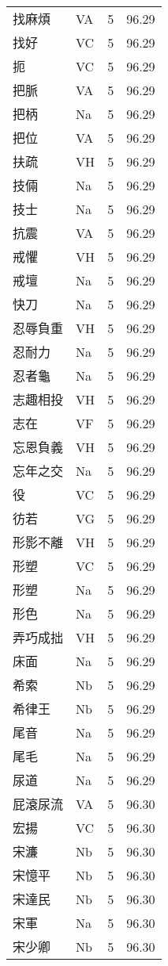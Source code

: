\documentclass[twocolumn]{book}
\begin{document}
\begin{supertabular}{llrr}
找麻煩 & VA & 5 &  96.29\\
找好 & VC & 5 &  96.29\\
扼 & VC & 5 &  96.29\\
把脈 & VA & 5 &  96.29\\
把柄 & Na & 5 &  96.29\\
把位 & VA & 5 &  96.29\\
扶疏 & VH & 5 &  96.29\\
技倆 & Na & 5 &  96.29\\
技士 & Na & 5 &  96.29\\
抗震 & VA & 5 &  96.29\\
戒懼 & VH & 5 &  96.29\\
戒壇 & Na & 5 &  96.29\\
快刀 & Na & 5 &  96.29\\
忍辱負重 & VH & 5 &  96.29\\
忍耐力 & Na & 5 &  96.29\\
忍者龜 & Na & 5 &  96.29\\
志趣相投 & VH & 5 &  96.29\\
志在 & VF & 5 &  96.29\\
忘恩負義 & VH & 5 &  96.29\\
忘年之交 & Na & 5 &  96.29\\
役 & VC & 5 &  96.29\\
彷若 & VG & 5 &  96.29\\
形影不離 & VH & 5 &  96.29\\
形塑 & VC & 5 &  96.29\\
形塑 & Na & 5 &  96.29\\
形色 & Na & 5 &  96.29\\
弄巧成拙 & VH & 5 &  96.29\\
床面 & Na & 5 &  96.29\\
希索 & Nb & 5 &  96.29\\
希律王 & Nb & 5 &  96.29\\
尾音 & Na & 5 &  96.29\\
尾毛 & Na & 5 &  96.29\\
尿道 & Na & 5 &  96.29\\
屁滾尿流 & VA & 5 &  96.30\\
宏揚 & VC & 5 &  96.30\\
宋濂 & Nb & 5 &  96.30\\
宋憶平 & Nb & 5 &  96.30\\
宋達民 & Nb & 5 &  96.30\\
宋軍 & Na & 5 &  96.30\\
宋少卿 & Nb & 5 &  96.30\\

\end{supertabular}
\end{document}
